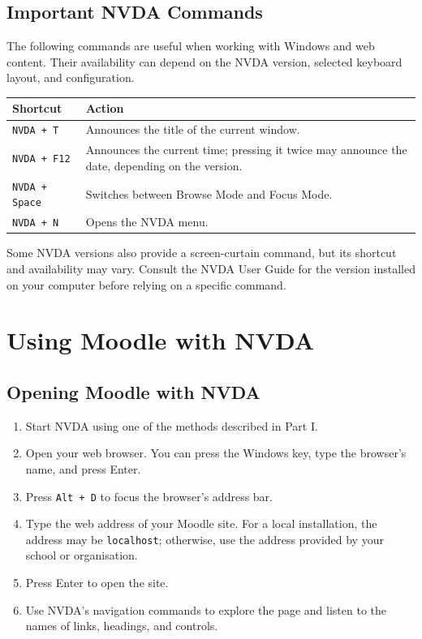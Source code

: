 \documentclass[11pt,oneside]{book}
\begin{document}
\chapter{Important NVDA Commands}
The following commands are useful when working with Windows and web content. Their availability can depend on the NVDA version, selected keyboard layout, and configuration.

\begin{center}
	\begin{tabular}{p{}p{}}
		\toprule
		\textbf{Shortcut}     & \textbf{Action}                                                                                \\
		\midrule
		\texttt{NVDA + T}     & Announces the title of the current window.                                                     \\
		\texttt{NVDA + F12}   & Announces the current time; pressing it twice may announce the date, depending on the version. \\
		\texttt{NVDA + Space} & Switches between Browse Mode and Focus Mode.                                                   \\
		\texttt{NVDA + N}     & Opens the NVDA menu.                                                                           \\
		\bottomrule
	\end{tabular}
\end{center}
Some NVDA versions also provide a screen-curtain command, but its shortcut and availability may vary. Consult the NVDA User Guide for the version installed on your computer before relying on a specific command.

\part{Using Moodle with NVDA}

\chapter{Opening Moodle with NVDA}
\begin{enumerate}
	\item Start NVDA using one of the methods described in Part I.
	\item Open your web browser. You can press the Windows key, type the browser's name, and press Enter.
	\item Press \texttt{Alt + D} to focus the browser's address bar.
	\item Type the web address of your Moodle site. For a local installation, the address may be \texttt{localhost}; otherwise, use the address provided by your school or organisation.
	\item Press Enter to open the site.
	\item Use NVDA's navigation commands to explore the page and listen to the names of links, headings, and controls.
\end{enumerate}
\end{document}
